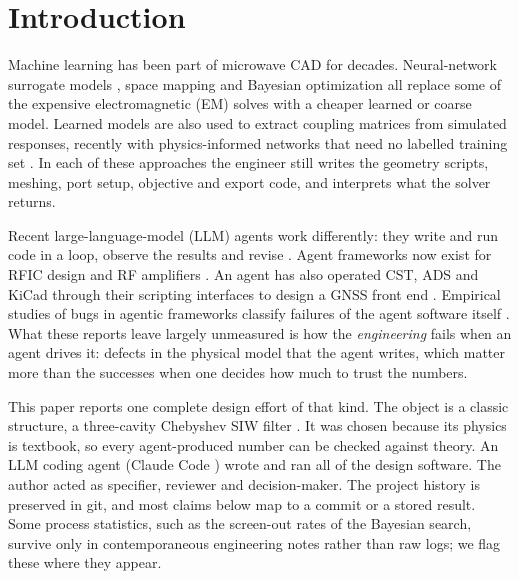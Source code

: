\documentclass{ieeeaccess}
\begin{document}
\titlepgskip=-21pt

\maketitle

\hypertarget{introduction}{%
\section{Introduction}\label{introduction}}

Machine learning has been part of microwave CAD for decades. Neural-network
surrogate models \cite{zhang2000neural}, space mapping \cite{bandler2004space} and
Bayesian optimization \cite{jones1998efficient, snoek2012practical} all replace
some of the expensive electromagnetic (EM) solves with a cheaper learned or
coarse model. Learned models are also used to extract coupling matrices from
simulated responses, recently with physics-informed networks that need no
labelled training set \cite{sallam2026pidnn}. In each of these approaches the engineer still writes the
geometry scripts, meshing, port setup, objective and export code, and
interprets what the solver returns.

Recent large-language-model (LLM) agents work differently: they write and run
code in a loop, observe the results and revise \cite{yao2023react, yang2024sweagent}. Agent frameworks now exist for RFIC design
\cite{xing2026rfagent} and RF amplifiers \cite{lu2026rfampdesigner}. An agent has also
operated CST, ADS and KiCad through their scripting interfaces to design a GNSS
front end \cite{heinrichs2026prompt}. Empirical studies of bugs in agentic
frameworks classify failures of the agent software itself
\cite{zhang2026agenticbugs}. What these reports leave largely unmeasured is how the
\emph{engineering} fails when an agent drives it: defects in the physical model
that the agent writes, which matter more than the successes when one decides
how much to trust the numbers.

This paper reports one complete design effort of that kind. The object is a
classic structure, a three-cavity Chebyshev SIW filter
\cite{deslandes2003single, bozzi2011review, chen2014siwfilter}. It was chosen
because its physics is textbook, so every agent-produced number can be
checked against theory. An LLM coding agent (Claude Code \cite{claudecode})
wrote and ran all of the design software. The author acted as specifier,
reviewer and decision-maker. The project history is preserved in git, and most
claims below map to a commit or a stored result. Some process statistics,
such as the screen-out rates of the Bayesian search, survive only in
contemporaneous engineering notes rather than raw logs; we flag these where
they appear.
\end{document}
